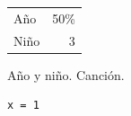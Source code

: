 \documentclass[spanish]{article}
\begin{document}
\begin{tabular}{lr}
\toprule
Año & 50\% \\
Niño & 3 \\
\bottomrule
\end{tabular}
\begin{minipage}{3cm}Año y niño. Canción.\end{minipage}
\begin{lstlisting}[caption={Un código}]
x = 1
\end{lstlisting}
\end{document}
